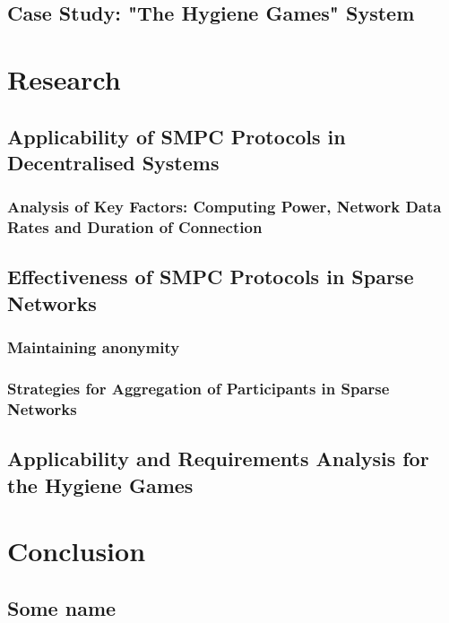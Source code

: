 	\section{Case Study: "The Hygiene Games" System}

\chapter{Research}
	\section{Applicability of SMPC Protocols in Decentralised Systems}
	
	\subsection*{Analysis of Key Factors: Computing Power, Network Data Rates and Duration of Connection}
	\section{Effectiveness of SMPC Protocols in Sparse Networks}
	\subsection*{Maintaining anonymity}
	\subsection*{Strategies for Aggregation of Participants in Sparse Networks}
	\section{Applicability and Requirements Analysis for the Hygiene Games}

\chapter{Conclusion}

\clearpage
\renewcommand{\bibname}{References} %
\printbibliography[heading=bibintoc]

\begin{appendices}
	\chapter{Some name}
	\lipsum[3]
\end{appendices}

